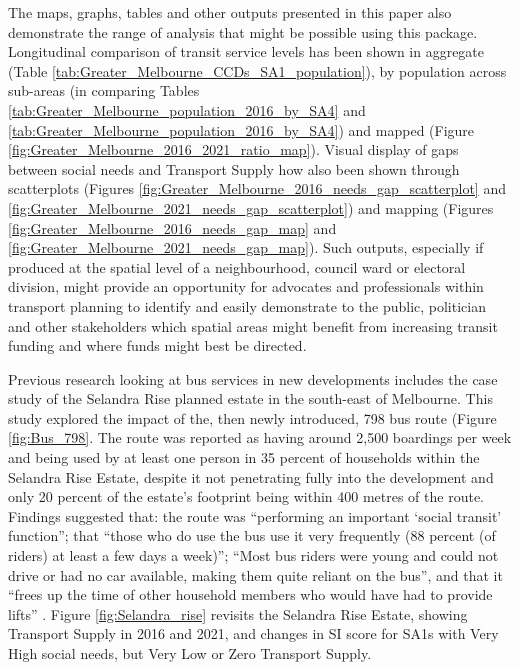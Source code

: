 \documentclass[preprint, 3p,
authoryear]{elsarticle} %
\begin{document}
The maps, graphs, tables and other outputs presented in this paper also
demonstrate the range of analysis that might be possible using this
package. Longitudinal comparison of transit service levels has been
shown in aggregate (Table
\ref{tab:Greater_Melbourne_CCDs_SA1_population}), by population across
sub-areas (in comparing Tables
\ref{tab:Greater_Melbourne_population_2016_by_SA4} and
\ref{tab:Greater_Melbourne_population_2016_by_SA4}) and mapped (Figure
\ref{fig:Greater_Melbourne_2016_2021_ratio_map}). Visual display of gaps
between social needs and Transport Supply how also been shown through
scatterplots (Figures
\ref{fig:Greater_Melbourne_2016_needs_gap_scatterplot} and
\ref{fig:Greater_Melbourne_2021_needs_gap_scatterplot}) and mapping
(Figures \ref{fig:Greater_Melbourne_2016_needs_gap_map} and
\ref{fig:Greater_Melbourne_2021_needs_gap_map}). Such outputs,
especially if produced at the spatial level of a neighbourhood, council
ward or electoral division, might provide an opportunity for advocates
and professionals within transport planning to identify and easily
demonstrate to the public, politician and other stakeholders which
spatial areas might benefit from increasing transit funding and where
funds might best be directed.

Previous research looking at bus services in new developments includes
the \citet{delbosc2015impact} case study of the Selandra Rise planned
estate in the south-east of Melbourne. This study explored the impact of
the, then newly introduced, 798 bus route (Figure \ref{fig:Bus_798}. The
route was reported as having around 2,500 boardings per week and being
used by at least one person in 35 percent of households within the
Selandra Rise Estate, despite it not penetrating fully into the
development and only 20 percent of the estate's footprint being within
400 metres of the route. Findings suggested that: the route was
``performing an important `social transit' function''; that ``those who
do use the bus use it very frequently (88 percent (of riders) at least a
few days a week)''; ``Most bus riders were young and could not drive or
had no car available, making them quite reliant on the bus'', and that
it ``frees up the time of other household members who would have had to
provide lifts'' \citep[p.10]{delbosc2015impact}. Figure
\ref{fig:Selandra_rise} revisits the Selandra Rise Estate, showing
Transport Supply in 2016 and 2021, and changes in SI score for SA1s with
Very High social needs, but Very Low or Zero Transport Supply.
\end{document}
